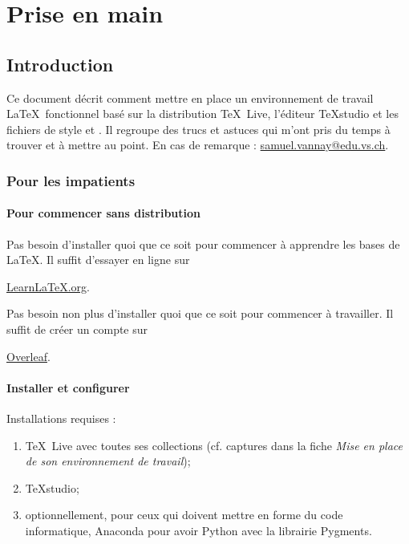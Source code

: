 \chapter{Prise en main}






\section{Introduction}

Ce document décrit comment mettre en place un environnement de travail \LaTeX \ fonctionnel basé sur la distribution \TeX \ Live, l'éditeur TeXstudio et les fichiers de style  et \newline
{}. Il regroupe des trucs et astuces qui m'ont pris du temps à trouver et à mettre au point. En cas de remarque : \href{mailto:samuel.vannay@edu.vs.ch}{samuel.vannay@edu.vs.ch}.



\subsection{Pour les impatients}


\subsubsection{Pour commencer sans distribution}

Pas besoin d'installer quoi que ce soit pour commencer à apprendre les bases de \LaTeX. Il suffit d'essayer en ligne sur
\begin{center}
	\href{https://www.learnlatex.org/fr/}{Learn\LaTeX.org}.
\end{center}

Pas besoin non plus d'installer quoi que ce soit pour commencer à travailler. Il suffit de créer un compte sur
\begin{center}
	\href{https://www.overleaf.com/}{Overleaf}.
\end{center}


\subsubsection{Installer et configurer}

Installations requises :
\begin{enumerate}
	\item \TeX \ Live avec toutes ses collections (cf. captures dans la fiche \emph{Mise en place de son environnement de travail});
	\item TeXstudio;
	\item optionnellement, pour ceux qui doivent mettre en forme du code informatique, Anaconda pour avoir Python avec la librairie Pygments.
\end{enumerate}

